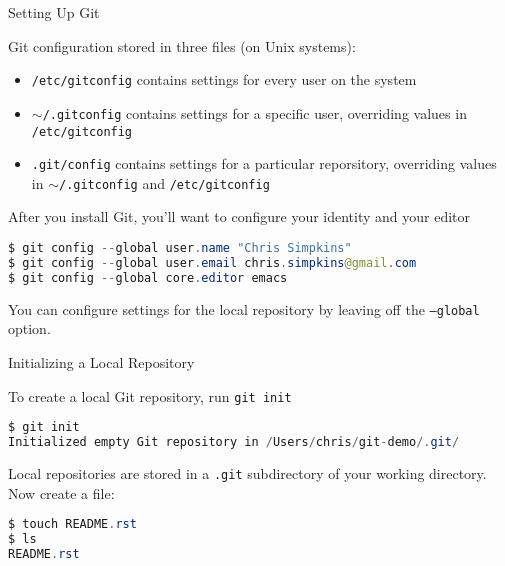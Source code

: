 \documentclass{beamer}
\begin{document}
\begin{frame}[fragile]{Setting Up Git}


Git configuration stored in three files (on Unix systems):
\begin{itemize}
\item {\tt /etc/gitconfig} contains settings for every user on the system
\item {\tt $\sim$/.gitconfig} contains settings for a specific user, overriding values in {\tt /etc/gitconfig}
\item {\tt .git/config} contains settings for a particular reporsitory, overriding values in {\tt $\sim$/.gitconfig} and {\tt /etc/gitconfig}
\end{itemize}

After you install Git, you'll want to configure your identity and your editor

\begin{lstlisting}[language=Java]
$ git config --global user.name "Chris Simpkins"
$ git config --global user.email chris.simpkins@gmail.com
$ git config --global core.editor emacs
\end{lstlisting}
You can configure settings for the local repository by leaving off the {\tt --global} option.

\end{frame}

\begin{frame}[fragile]{Initializing a Local Repository}


To create a local Git repository, run {\tt git init}
\begin{lstlisting}[language=Java]
$ git init
Initialized empty Git repository in /Users/chris/git-demo/.git/
\end{lstlisting}
Local repositories are stored in a {\tt .git} subdirectory of your working directory.
\vspace{.1in}
Now create a file:
\begin{lstlisting}[language=Java]
$ touch README.rst
$ ls
README.rst
\end{lstlisting}


\end{frame}
\end{document}
